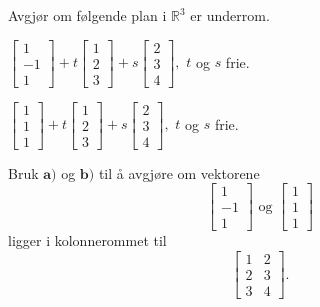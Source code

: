 \begin{oppgave}
Avgjør om følgende plan i $\mathbb{R}^3$ er underrom.
\begin{punkt}$
\begin{bmatrix}
1\\
-1\\
1
\end{bmatrix}+t\begin{bmatrix}
1\\
2\\
3
\end{bmatrix}+
s\begin{bmatrix}
2\\
3\\
4
\end{bmatrix},$ $t$ og $s$ frie.
\end{punkt}

\begin{punkt}$
\begin{bmatrix}
1\\
1\\
1
\end{bmatrix}+t\begin{bmatrix}
1\\
2\\
3
\end{bmatrix}+
s\begin{bmatrix}
2\\
3\\
4
\end{bmatrix},$ $t$ og $s$ frie.
\end{punkt}

\begin{punkt}
Bruk $\textbf{a)}$ og $\textbf{b)}$ til å avgjøre om vektorene $$\begin{bmatrix}
1\\
-1\\
1
\end{bmatrix}\text{ og }\begin{bmatrix}
1\\
1\\
1
\end{bmatrix}$$ligger i kolonnerommet til 
$$
\begin{bmatrix}
1 & 2\\
2 & 3\\
3 & 4
\end{bmatrix}.
$$
\end{punkt}
\end{oppgave}

